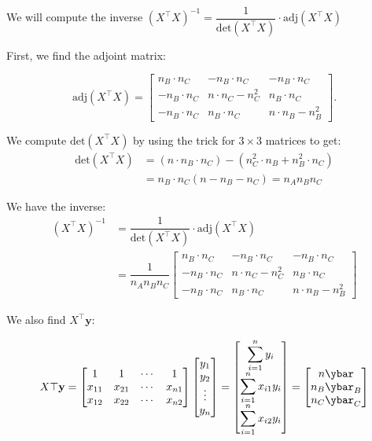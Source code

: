 \documentclass[12pt]{article}
\newcommand{\snmath}{\displaystyle\sum_{i=1}^n}
\newcommand{\na}{n_A}
\newcommand{\nb}{n_B}
\newcommand{\nc}{n_C}
\begin{document}
\begin{enumerate}
\begin{tcolorbox}[colback = white, sharp corners]
We will compute the inverse $ \left( X^\top X \right)^{-1} = \dfrac{1}{\mathrm{det}(X^\top X)} \cdot \mathrm{adj}(X^\top X)$

First, we find the adjoint matrix: 

\[
	\mathrm{adj}(X^\top X) = \begin{bmatrix} \nb \cdot \nc & - \nb \cdot \nc  & - \nb \cdot \nc  \\ - \nb \cdot \nc  & n \cdot \nc - \nc^2 & \nb \cdot \nc  \\
	- \nb \cdot \nc  & \nb \cdot \nc & n \cdot \nb - \nb^2   \end{bmatrix}. 
\]

We compute $\mathrm{det}(X^\top X)$ by using the trick for $3 \times 3$ matrices to get:
\begin{align*}
	\mathrm{det}(X^\top X) &= \left( n \cdot \nb \cdot \nc \right) - \left( \nc^2 \cdot \nb + \nb^2 \cdot \nc \right) \\
	&= \nb \cdot \nc \left( n - \nb - \nc \right) = \na \nb \nc 
\end{align*}

We have the inverse: 
\begin{align*}
	\left( X^\top X \right)^{-1} &= \dfrac{1}{\mathrm{det}(X^\top X)} \cdot \mathrm{adj}(X^\top X) \\
	&= \dfrac{1}{\na \nb \nc} \begin{bmatrix} \nb \cdot \nc & - \nb \cdot \nc  & - \nb \cdot \nc  \\ - \nb \cdot \nc  & n \cdot \nc - \nc^2 & \nb \cdot \nc  \\
	- \nb \cdot \nc  & \nb \cdot \nc & n \cdot \nb - \nb^2   \end{bmatrix}
\end{align*}

We also find $X^\top \mathbf{y}$:

\[
	X\top \mathbf{y} = \begin{bmatrix} 1 & 1 & \cdots & 1 \\ 
	x_{11} & x_{21} & \cdots & x_{n1} \\ x_{12} & x_{22} & \cdots & x_{n2} \end{bmatrix} \begin{bmatrix} y_1 \\ y_2 \\ \vdots \\ y_n \end{bmatrix} = \begin{bmatrix} \snmath y_i \\
	\snmath x_{i1} y_i \\
	\snmath x_{i2} y_i \end{bmatrix} = \begin{bmatrix} n\ybar \\ \nb \ybar_B \\
	\nc \ybar_C \end{bmatrix}
\]


\end{tcolorbox}
\end{enumerate}
\end{document}
